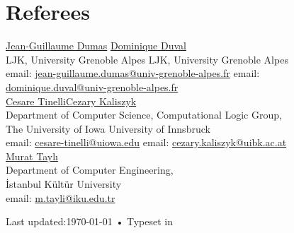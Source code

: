 \documentclass[10pt, a4paper]{article}
\begin{document}
\section*{Referees}
\href{http://ljk.imag.fr/membres/Jean-Guillaume.Dumas/}{Jean-Guillaume Dumas} \hfill \href{http://ljk.imag.fr/membres/Dominique.Duval/}{Dominique Duval}\\
LJK, University Grenoble Alpes \hfill LJK, University Grenoble Alpes\\
email: \href{mailto:jean-guillaume.dumas@univ-grenoble-alpes.fr}{jean-guillaume.dumas@univ-grenoble-alpes.fr} \hfill email: \href{mailto:dominique.duval@univ-grenoble-alpes.fr}{dominique.duval@univ-grenoble-alpes.fr}\\

\href{http://homepage.cs.uiowa.edu/~tinelli/index.html}{Cesare Tinelli}\hfill \href{http://cl-informatik.uibk.ac.at/users/cek/}{Cezary Kaliszyk}\\
Department of Computer Science, \hfill Computational Logic Group,\\
The University of Iowa \hfill University of Innsbruck\\
email: \href{mailto:cesare-tinelli@uiowa.edu}{cesare-tinelli@uiowa.edu} \hfill email: \href{mailto:cezary.kaliszyk@uibk.ac.at}{cezary.kaliszyk@uibk.ac.at}\\


\href{https://bm.iku.edu.tr/tr/bilgisayar-muhendisligi-bolumu-akademik-kadro}{Murat Taylı}\hfill\\
Department of Computer Engineering, \hfill \\
İstanbul Kültür University \hfill \\
email: \href{mailto: m.tayli@iku.edu.tr}{m.tayli@iku.edu.tr} \hfill 
\begin{center}
{\scriptsize  Last updated:\today\- •\- 
Typeset in \href{http://en.wikipedia.org/wiki/XeTeX}{
\XeTeX}}
\end{center}
\end{document}
